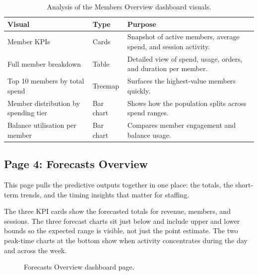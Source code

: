 \documentclass[12pt, a4paper]{report}
\begin{document}
\begin{table}[H]
  \centering
  \caption{Analysis of the Members Overview dashboard visuals.\label{tab:ops_analysis}}
  \begin{tabular}{p{3.5cm} p{2.5cm} p{7cm}}
    \toprule
    \textbf{Visual} & \textbf{Type} & \textbf{Purpose} \\
    \midrule
    Member KPIs
      & Cards
      & Snapshot of active members, average spend, and session activity. \\[4pt]
    Full member breakdown
      & Table
      & Detailed view of spend, usage, orders, and duration per member. \\[4pt]
    Top 10 members by total spend
      & Treemap
      & Surfaces the highest-value members quickly. \\[4pt]
    Member distribution by spending tier
      & Bar chart
      & Shows how the population splits across spend ranges. \\[4pt]
    Balance utilisation per member
      & Bar chart
      & Compares member engagement and balance usage. \\
    \bottomrule
  \end{tabular}
\end{table}

\subsection{Page 4: Forecasts Overview}

This page pulls the predictive outputs together in one place: the totals, the
short-term trends, and the timing insights that matter for staffing.

The three KPI cards show the forecasted totals for revenue, members, and sessions.
The three forecast charts sit just below and include upper and lower bounds so the
expected range is visible, not just the point estimate. The two peak-time charts
at the bottom show when activity concentrates during the day and across the week.

\begin{figure}[H]
  \centering
  \caption{Forecasts Overview dashboard page.\label{fig:dash_forecasts}}
\end{figure}
\end{document}
